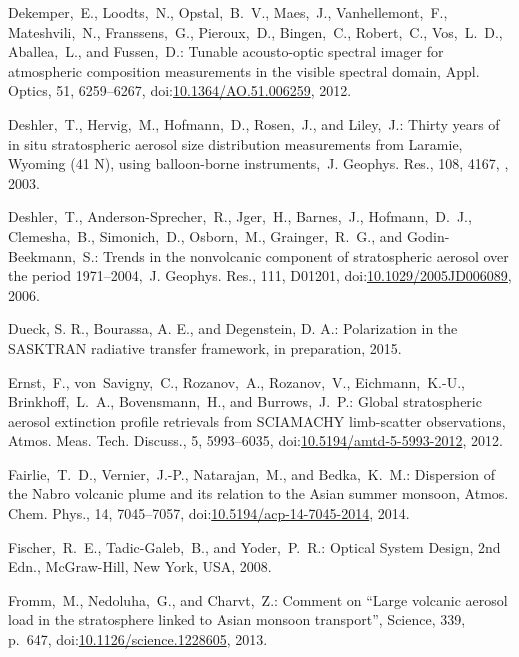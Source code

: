 \documentclass[amtd, online, hvmath]{copernicus}
\begin{document}
\begin{thebibliography}{99}
Dekemper,~E., Loodts,~N., Opstal,~B.~V., Maes,~J., Vanhellemont,~F.,
Mateshvili,~N., Franssens,~G., Pieroux,~D., Bingen,~C., Robert,~C.,
Vos,~L.~D., Aballea,~L., and Fussen,~D.: Tunable acousto-optic spectral
imager for atmospheric composition measurements in the visible spectral
domain, Appl. Optics, 51, 6259--6267,
doi:\href{http://dx.doi.org/10.1364/AO.51.006259}{10.1364/AO.51.006259},
2012.


Deshler,~T., Hervig,~M., Hofmann,~D., Rosen,~J., and Liley,~J.: Thirty years
of in situ stratospheric aerosol size distribution measurements from Laramie,
Wyoming (41 N), using balloon-borne instruments,~J. Geophys. Res., 108, 4167,
, 2003.


Deshler,~T., Anderson-Sprecher,~R., Jger,~H., Barnes,~J., Hofmann,~D.~J.,
Clemesha,~B., Simonich,~D., Osborn,~M., Grainger,~R.~G., and
Godin-Beekmann,~S.: Trends in the nonvolcanic component of stratospheric
aerosol over the period 1971--2004,~J. Geophys. Res., 111, D01201,
doi:\href{http://dx.doi.org/10.1029/2005JD006089}{10.1029/2005JD006089},
2006.


Dueck, S. R., Bourassa, A. E., and Degenstein, D. A.: Polarization in the
SASKTRAN radiative transfer framework, in preparation, 2015.


Ernst,~F., von~Savigny,~C., Rozanov,~A., Rozanov,~V., Eichmann,~K.-U.,
Brinkhoff,~L.~A., Bovensmann,~H., and Burrows,~J.~P.: Global stratospheric
aerosol extinction profile retrievals from SCIAMACHY limb-scatter
observations, Atmos. Meas. Tech. Discuss., 5, 5993--6035,
doi:\href{http://dx.doi.org/10.5194/amtd-5-5993-2012}{10.5194/amtd-5-5993-2012},
2012.




Fairlie,~T.~D., Vernier,~J.-P., Natarajan,~M., and Bedka,~K.~M.: Dispersion
of the Nabro volcanic plume and its relation to the Asian summer monsoon,
Atmos. Chem. Phys., 14, 7045--7057,
doi:\href{http://dx.doi.org/10.5194/acp-14-7045-2014}{10.5194/acp-14-7045-2014},
2014.



Fischer,~R.~E., Tadic-Galeb,~B., and Yoder,~P.~R.: Optical System Design, 2nd
Edn., McGraw-Hill, New York, USA, 2008.


Fromm,~M., Nedoluha,~G., and Charvt,~Z.: Comment on ``Large volcanic aerosol
load in the stratosphere linked to Asian monsoon transport'', Science, 339,
p.~647,
doi:\href{http://dx.doi.org/10.1126/science.1228605}{10.1126/science.1228605},
2013.



\end{thebibliography}
\end{document}
